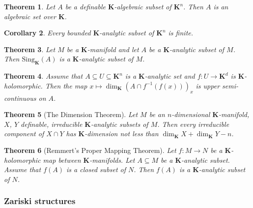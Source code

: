 \documentclass{amsart}
\newtheorem{theorem}{Theorem}[subsection]
\newtheorem{corollary}[theorem]{Corollary}
\theoremstyle{definition}
\numberwithin{equation}{section}
\begin{document}
\begin{tcolorbox}[title = {Definable Chow's Theorem}]
	\begin{theorem}
		Let $A$ be a definable $\mathbf{K}$-algebraic subset of $\mathbf{K}^n$.
		Then $A$ is an algebraic set over $\mathbf{K}$.
	\end{theorem}
\end{tcolorbox}

\begin{corollary}
	Every bounded $\mathbf{K}$-analytic subset of $\mathbf{K}^n$ is finite.
\end{corollary}

\begin{tcolorbox}
	\begin{theorem}
		Let $M$ be a $\mathbf{K}$-manifold and let $A$ be a $\mathbf{K}$-analytic subset of $M$.
		Then $\mathrm{Sing}_{\mathbf{K}}(A)$ is a $\mathbf{K}$-analytic subset of $M$.
	\end{theorem}
\end{tcolorbox}

\begin{theorem}
	Assume that $A \subseteq U \subseteq \mathbf{K}^n$ is a $\mathbf{K}$-analytic set and $f: U \to \mathbf{K}^d$ is $\mathbf{K}$-holomorphic.
	Then the map $x\mapsto \dim_{\mathbf{K}}(A\cap f^{-1}(f(x)))_x$ is upper semi-continuous on $A$.
\end{theorem}

\begin{theorem}[The Dimension Theorem]
	Let $M$ be an $n$-dimensional \hspace{0em}
	$\mathbf{K}$-manifold,
	$X$, $Y$ definable, irreducible $\mathbf{K}$-analytic subsets of $M$.
	Then every irreducible component of $X \cap Y$ has $\mathbf{K}$-dimension not less than $\dim_{\mathbf{K}}X + \dim_{\mathbf{K}}Y - n$.
\end{theorem}

\begin{theorem}[Remmert's Proper Mapping Theorem]
	Let $f: M \to N$ be a $\mathbf{K}$-holomorphic map between $\mathbf{K}$-manifolds.
	Let $A \subseteq M$ be a $\mathbf{K}$-analytic subset.
	Assume that $f(A)$ is a closed subset of $N$.
	Then $f(A)$ is a $\mathbf{K}$-analytic subset of $N$.
\end{theorem}

\subsubsection{Zariski structures}
\end{document}
